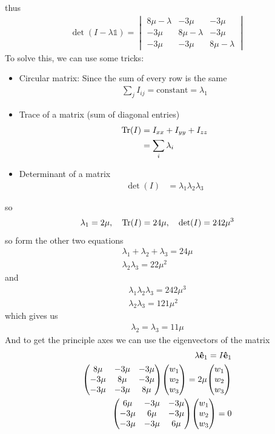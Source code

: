 \documentclass[../main.tex]{subfiles}
\begin{document}
thus
\begin{align*}
    \det(I - \lambda \mathbb{1}) = \begin{vmatrix}
        8\mu - \lambda & -3\mu & -3\mu \\
        -3\mu & 8\mu - \lambda & -3\mu \\
        -3\mu & -3\mu & 8\mu - \lambda
    \end{vmatrix}
\end{align*}
To solve this, we can use some tricks:
\begin{itemize}
    \item Circular matrix: Since the sum of every row is the same
    \begin{align*}
        \sum_j I_{ij} = \text{constant} = \lambda_1
    \end{align*}
    \item Trace of a matrix (sum of diagonal entries) 
    \begin{align*}
        \Tr(I) &= I_{xx} + I_{yy} + I_{zz} \\
            &= \sum_i \lambda_i
    \end{align*}
    \item Determinant of a matrix
    \begin{align*}
        \det(I) &= \lambda_1 \lambda_2 \lambda_3
    \end{align*}
\end{itemize}
so
\begin{align*}
    \lambda_1 = 2 \mu,\quad \Tr(I) = 24\mu,\quad \det(I) = 242\mu^3
\end{align*}
so form the other two equations
\begin{align*}
    \lambda_1 + \lambda_2 + \lambda_3 = 24\mu \\
    \lambda_2 \lambda_3 = 22\mu^2
\end{align*}
and
\begin{align*}
    \lambda_1 \lambda_2 \lambda_3 = 242\mu^3 \\
    \lambda_2 \lambda_3 = 121\mu^2
\end{align*}
which gives us
\begin{align*}
    \lambda_2 = \lambda_3 = 11\mu
\end{align*}
And to get the principle axes we can use the eigenvectors of the matrix
\begin{align*}
    \lambda \vu e_1 = I \vu e_1 \\
    \mqty(8\mu & -3\mu & -3\mu \\ -3\mu & 8\mu & -3\mu \\ -3\mu & -3\mu & 8\mu) 
    \mqty(w_1 \\ w_2 \\ w_3) = 2\mu \mqty(w_1 \\ w_2 \\ w_3) \\
    \mqty(6\mu & -3\mu & -3\mu \\ -3\mu & 6\mu & -3\mu \\ -3\mu & -3\mu & 6\mu)
    \mqty(w_1 \\ w_2 \\ w_3) = 0
\end{align*}
\end{document}
